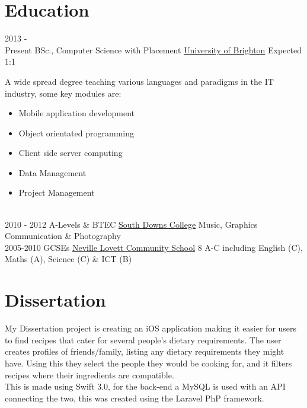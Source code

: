\documentclass[letterpaper]{twentysecondcv} %
\begin{document}
\makeprofile %

\section{Education}

\begin{twenty} %
	\twentyitem
    	{2013 - \\Present}
       	{BSc., Computer Science with Placement}
      	{\href{https://www.brighton.ac.uk/index.aspx}{University of Brighton}}
       	{Expected 1:1}
		{A wide spread degree teaching various languages and paradigms in the IT industry, some key modules are:
       		{\vspace{2mm}
       			\begin{itemize}
       			\setlength\itemsep{.5mm}
			        \item Mobile application development
			        \item Object orientated programming
					 \item Client side server computing
					 \item Data Management
					 \item Project Management
			    \end{itemize}
			}
        }
	\twentyitem
    	{\\2010 - 2012}
        {A-Levels \& BTEC}
        {\href{http://www.southdowns.ac.uk/}{South Downs College}}
        {}
        {Music, Graphics Communication \& Photography}
    \twentyitem
    	{\\2005-2010}
    	{GCSEs}
    	{\href{https://www.fareham-academy.hants.sch.uk/}{Neville Lovett Community School}}
    	{}
    	{8 A-C including English (C), Maths (A), Science (C) \& ICT (B)}
\end{twenty}

\vspace{-1mm}
\section{Dissertation}
\vspace{-5mm}
\begin{twenty}
	\twentyitem
		{}
		{}
		{}
		{}
		{
			My Dissertation project is creating an iOS application making it easier for users to find recipes that cater for several people's dietary requirements. The user creates profiles of friends/family, listing any dietary requirements they might have. Using this they select the people they would be cooking for, and it filters recipes where their ingredients are compatible.
			\vspace{2mm}
			\\
			This is made using Swift 3.0, for the back-end a MySQL is used with an API connecting the two, this was created using the Laravel PhP framework.
		}
\end{twenty}
\end{document}

